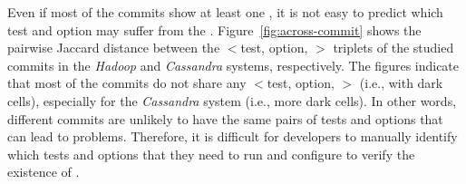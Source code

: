 Even if most of the commits show at least one \inconsistent, it is not easy to predict which test and option may suffer from the \inconsistent. 
Figure~\ref{fig:across-commit} shows the pairwise Jaccard distance between the $<$test, option, \inconsistent$>$ triplets of the studied commits in the \emph{Hadoop} and \emph{Cassandra} systems, respectively. %
The figures indicate that most of the commits do not share any $<$test, option, \inconsistent$>$ (i.e., with dark cells), especially for the \emph{Cassandra} system (i.e., more dark cells).
In other words, different commits are unlikely to have the same pairs of tests and options that can lead to \inconsistent problems. %
Therefore, it is difficult for developers to manually identify which tests and options that they need to run and configure to verify the existence of \inconsistent. %

